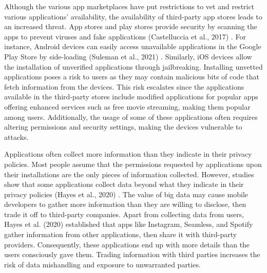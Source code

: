 \documentclass{article}
\begin{document}
\medskip

Although the various app marketplaces have put restrictions to vet and restrict various applications’ availability, the availability of third-party app stores leads to an increased threat. App stores and play stores provide security by scanning the apps to prevent viruses and fake applications (Castelluccia et al., 2017) \cite{Castelluccia17}. For instance, Android devices can easily access unavailable applications in the Google Play Store by side-loading (Suleman et al., 2021) \cite{Suleman21}. Similarly, iOS devices allow the installation of unverified applications through jailbreaking. Installing unvetted applications poses a risk to users as they may contain malicious bits of code that fetch information from the devices. This risk escalates since the applications available in the third-party stores include modified applications for popular apps offering enhanced services such as free movie streaming, making them popular among users. Additionally, the usage of some of these applications often requires altering permissions and security settings, making the devices vulnerable to attacks. 


\medskip

Applications often collect more information than they indicate in their privacy policies. Most people assume that the permissions requested by applications upon their installations are the only pieces of information collected. However, studies show that some applications collect data beyond what they indicate in their privacy policies (Hayes et al., 2020) \cite{Hayes20}. The value of big data may cause mobile developers to gather more information than they are willing to disclose, then trade it off to third-party companies. Apart from collecting data from users, Hayes et al. (2020) \cite{Hayes20} established that apps like Instagram, Seamless, and Spotify gather information from other applications, then share it with third-party providers. Consequently, these applications end up with more details than the users consciously gave them. Trading information with third parties increases the risk of data mishandling and exposure to unwarranted parties.


\medskip
\end{document}
